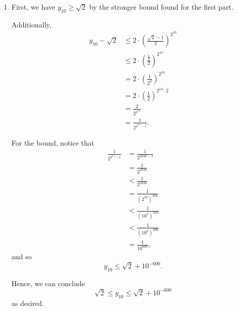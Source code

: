 \begin{enumerate}
\begin{enumerate}
              \item First, we have \(y_{10} \geq \sqrt{2}\) by the stronger bound found for the first part.

                    Additionally,
                    \begin{align*}
                        y_{10} - \sqrt{2} & \leq 2 \cdot \left(\frac{\sqrt{2} - 1}{2}\right)^{2^{10}} \\
                                          & \leq 2 \cdot \left(\frac{\frac{1}{2}}{2}\right)^{2^{10}}  \\
                                          & = 2 \cdot \left(\frac{1}{2^2}\right)^{2^{10}}             \\
                                          & = 2 \cdot \left(\frac{1}{2}\right)^{2^{10} \cdot 2}       \\
                                          & = \frac{2}{2^{2^{11}}}                                    \\
                                          & = \frac{1}{2^{2^{11} - 1}}.
                    \end{align*}

                    For the bound, notice that
                    \begin{align*}
                        \frac{1}{2^{2^{11} - 1}} & = \frac{1}{2^{2048 - 1}}              \\
                                                 & = \frac{1}{2^{2047}}                  \\
                                                 & < \frac{1}{2^{2040}}                  \\
                                                 & = \frac{1}{\left(2^{10}\right)^{204}} \\
                                                 & < \frac{1}{\left(10^{3}\right)^{204}} \\
                                                 & < \frac{1}{\left(10^{3}\right)^{200}} \\
                                                 & = \frac{1}{10^{600}},
                    \end{align*}
                    and so
                    \[
                        y_{10} \leq \sqrt{2} + 10^{-600}.
                    \]

                    Hence, we can conclude
                    \[
                        \sqrt{2} \leq y_{10} \leq \sqrt{2} + 10^{-600}
                    \]
                    as desired.
          \end{enumerate}
\end{enumerate}